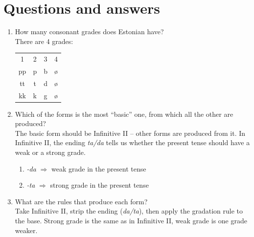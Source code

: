\documentclass[a4paper, 12pt]{article}
\begin{document}
	\section{Questions and answers}
	
\begin{enumerate}[$\gg$]
	\item How many consonant grades does Estonian have?\\
	There are 4 grades:
\begin{table}[H]
\begin{tabular}{cccc}
1  & 2 & 3 & 4 \\
pp & p & b & ø \\
tt & t & d & ø \\
kk & k & g & ø
\end{tabular}
\end{table}
	\item Which of the forms is the most ``basic'' one, from which all the other are produced? \\
		The basic form should be Infinitive II -- other forms are produced from it. In Infinitive II, the ending \emph{ta/da} tells us whether the present tense should have a weak or a strong grade.
		\begin{enumerate}[$\cdot$]
			\item \emph{-da} $\Rightarrow$ weak grade in the present tense
			\item \emph{-ta} $\Rightarrow$ strong grade in the present tense
		\end{enumerate}
	\item What are the rules that produce each form?\\
	Take Infinitive II, strip the ending (\emph{da/ta}), then apply the gradation rule to the base. Strong grade is the same as in Infinitive II, weak grade is one grade weaker.\\
	

\end{enumerate}
\end{document}
